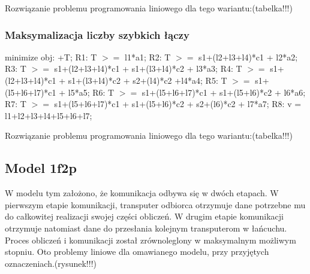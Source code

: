 \documentclass[a4paper,11pt, titlepage]{article}
\begin{document}
Rozwiązanie problemu programowania liniowego dla tego wariantu:(tabelka!!!)

\subsubsection{Maksymalizacja liczby szybkich łączy}
\begin{flushleft}

minimize obj: +T;\linebreak
\linebreak
R1: T $>=$ l1*a1;\linebreak
R2: T $>=$ s1+(l2+l3+l4)*c1 + l2*a2;\linebreak
R3: T $>=$ s1+(l2+l3+l4)*c1 + s1+(l3+l4)*c2 + l3*a3;\linebreak
R4: T $>=$ s1+(l2+l3+l4)*c1 + s1+(l3+l4)*c2 + s2+(l4)*c2 +l4*a4;\linebreak
R5: T $>=$ s1+(l5+l6+l7)*c1 + l5*a5;\linebreak
R6: T $>=$ s1+(l5+l6+l7)*c1 + s1+(l5+l6)*c2 + l6*a6;\linebreak
R7: T $>=$ s1+(l5+l6+l7)*c1 + s1+(l5+l6)*c2 +  s2+(l6)*c2 + l7*a7;\linebreak
R8: v = l1+l2+l3+l4+l5+l6+l7;\linebreak
\end{flushleft}

Rozwiązanie problemu programowania liniowego dla tego wariantu:(tabelka!!!)

\subsection{Model 1f2p}
W modelu tym założono, że komunikacja odbywa się w dwóch etapach. W pierwszym etapie komunikacji, transputer odbiorca otrzymuje dane potrzebne mu do całkowitej realizacji swojej części obliczeń. W drugim etapie komunikacji otrzymuje natomiast dane do przesłania kolejnym transputerom w łańcuchu. Proces obliczeń i komunikacji został zrównoleglony w maksymalnym możliwym stopniu. Oto problemy liniowe dla omawianego modelu, przy przyjętych oznaczeniach.(rysunek!!!)
\end{document}
